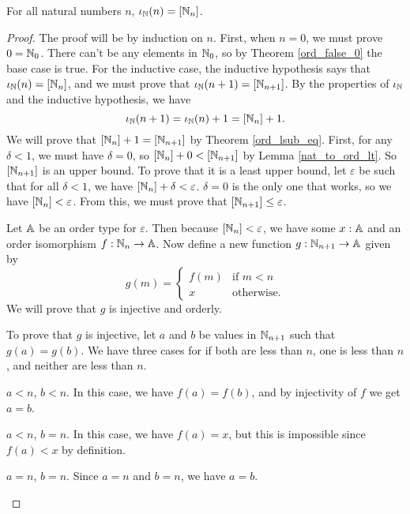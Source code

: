 \documentclass[../../math.tex]{subfiles}
\begin{document}
\begin{theorem} \label{from_nat_ord}
    For all natural numbers $n$, $\iota_{\mathbb{N}}(n) = [\mathbb{N}_n]$.
\end{theorem}
\begin{proof}
    The proof will be by induction on $n$.  First, when $n = 0$, we must prove
    $0 = \mathbb{N}_0$.  There can't be any elements in $\mathbb{N}_0$, so by Theorem
    \ref{ord_false_0} the base case is true.  For the inductive case, the
    inductive hypothesis says that $\iota_{\mathbb{N}}(n) = [\mathbb{N}_n]$, and we must prove that
    $\iota_{\mathbb{N}}(n + 1) = [\mathbb{N}_{n + 1}]$.  By the properties of $\iota_{\mathbb{N}}$ and the inductive
    hypothesis, we have
    \[
        \iota_{\mathbb{N}}(n + 1) = \iota_{\mathbb{N}}(n) + 1 = [\mathbb{N}_n] + 1.
    \]
    We will prove that $[\mathbb{N}_n] + 1 = [\mathbb{N}_{n + 1}]$ by Theorem \ref{ord_lsub_eq}.
    First, for any $\delta < 1$, we must have $\delta = 0$, so $[\mathbb{N}_n] + 0 <
    [\mathbb{N}_{n + 1}]$ by Lemma \ref{nat_to_ord_lt}.  So $[\mathbb{N}_{n + 1}]$ is an upper
    bound.  To prove that it is a least upper bound, let $\varepsilon$ be such
    that for all $\delta < 1$, we have $[\mathbb{N}_n] + \delta < \varepsilon$.  $\delta
    = 0$ is the only one that works, so we have $[\mathbb{N}_n] < \varepsilon$.  From
    this, we must prove that $[\mathbb{N}_{n + 1}] \leq \varepsilon$.

    Let $\mathbb{A}$ be an order type for $\varepsilon$.  Then because $[\mathbb{N}_n] <
    \varepsilon$, we have some $x : \mathbb{A}$ and an order isomorphism $f : \mathbb{N}_n \to
    \mathbb{A}$.  Now define a new function $g : \mathbb{N}_{n+1} \to \mathbb{A}$ given by
    \[
        g(m) = \begin{cases}
            f(m) & \text{if $m < n$} \\
            x & \text{otherwise.}
        \end{cases}
    \]
    We will prove that $g$ is injective and orderly.

    To prove that $g$ is injective, let $a$ and $b$ be values in $\mathbb{N}_{n + 1}$
    such that $g(a) = g(b)$.  We have three cases for if both are less than $n$,
    one is less than $n$, and neither are less than $n$.
    \setcounter{case}{0}
    \begin{case} $a < n$, $b < n$.
        In this case, we have $f(a) = f(b)$, and by injectivity of $f$ we get $a
        = b$.
    \end{case}
    \begin{case} $a < n$, $b = n$.
        In this case, we have $f(a) = x$, but this is impossible since $f(a) <
        x$ by definition.
    \end{case}
    \begin{case} $a = n$, $b = n$.
        Since $a = n$ and $b = n$, we have $a = b$.
    \end{case}


\end{proof}
\end{document}
